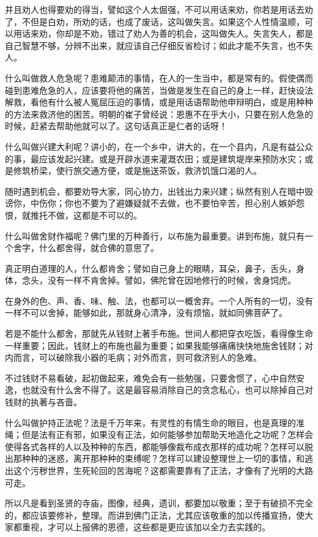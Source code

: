 \documentclass[12pt,twoside,openany]{book}
\begin{document}
并且劝人也得要劝的得当，譬如这个人太倔强，不可以用话来劝，你若是用话去劝了，不但是白劝，所劝的话，也成了废话，这叫做失言。如果这个人性情温顺，可以用话来劝，你却是不劝，错过了劝人为善的机会，这叫做失人。失言失人，都是自己智慧不够，分辨不出来，就应该自己仔细反省检讨；如此才能不失言，也不失人。

什么叫做救人危急呢？患难颠沛的事情，在人的一生当中，都是常有的。假使偶而碰到患难危急的人，应该要将他的痛苦，当做是发生在自己的身上一样，赶快设法解救，看他有什么被人冤屈压迫的事情，或是用话语帮助他申辩明白，或是用种种的方法来救济他的困苦。明朝的崔子曾经说：恩惠不在乎大小，只要在别人危急的时候，赶紧去帮助他就可以了。这句话真正是仁者的话呀！

什么叫做兴建大利呢？讲小的，在一个乡中，讲大的，在一个县内，凡是有益公众的事，最应该发起兴建。或是开辟水道来灌溉农田；或是建筑堤岸来预防水灾；或是修筑桥梁，使行旅交通方便，或是施送茶饭，救济饥饿口渴的人。

随时遇到机会，都要劝导大家，同心协力，出钱出力来兴建；纵然有别人在暗中毁谤你，中伤你；你也不要为了避嫌疑就不去做，也不要怕辛苦，担心别人嫉妒怨恨，就推托不做，这都是不可以的。

什么叫做舍财作福呢？佛门里的万种善行，以布施为最重要。讲到布施，就只有一个舍字，什么都舍得，就合佛的意思了。

真正明白道理的人，什么都肯舍；譬如自己身上的眼睛，耳朵，鼻子，舌头，身体，念头，没有一样不肯舍掉。譬如，佛陀曾在因地修行的时候，舍身饲虎。

在身外的色、声、香、味、触、法，也都可以一概舍弃。一个人所有的一切，没有一样不可以舍掉，能够如此，那就身心清净，没有烦恼，就如同佛菩萨了。

若是不能什么都舍，那就先从钱财上著手布施。世间人都把穿衣吃饭，看得像生命一样重要；因此，钱财上的布施也最为重要；如果我能够痛痛快快地施舍钱财；对内而言，可以破除我小器的毛病；对外而言，则可救济别人的急难。

不过钱财不易看破，起初做起来，难免会有一些勉强，只要舍惯了，心中自然安逸，也就没有什么舍不得了。这是最容易消除自己的贪念私心，也可以除掉自己对钱财的执著与吝啬。

什么叫做护持正法呢？法是千万年来，有灵性的有情生命的眼目，也是真理的准绳；但是法有正有邪，如果没有正法，如何能够参加帮助天地造化之功呢？怎样会使得各式各样的人以及种种的东西，都能够像裁布成衣那样的成功呢？怎样可以脱出那种种的迷惑，离开那种种的束缚呢？怎样可以建设整理世上一切的事情，和逃出这个污秽世界，生死轮回的苦海呢？这都需要靠有了正法，才像有了光明的大路可走。

所以凡是看到圣贤的寺庙，图像，经典，遗训，都要加以敬重；至于有破损不完全的，都应该要修补，整理。而讲到佛门正法，尤其应该敬重的加以传播宣扬，使大家都重视，才可以上报佛的恩德，这些都是更应该加以全力去实践的。
\end{document}
